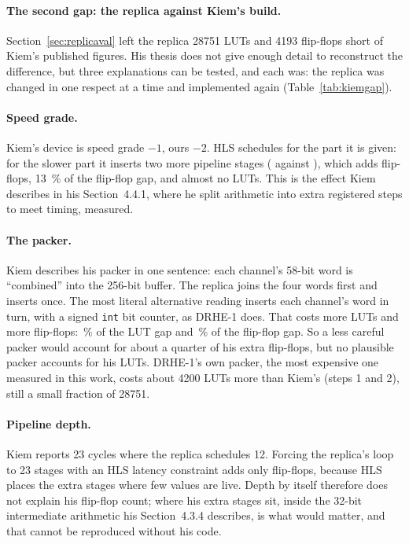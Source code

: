 \paragraph{The second gap: the replica against Kiem's build.}
Section~\ref{sec:replicaval} left the replica \num{28751} LUTs and \num{4193}
flip-flops short of Kiem's published figures. His thesis does not give enough
detail to reconstruct the difference, but three explanations can be tested, and
each was: the replica was changed in one respect at a time and implemented
again (Table~\ref{tab:kiemgap}).



\paragraph{Speed grade.} Kiem's device is speed grade $-1$, ours $-2$. HLS
schedules for the part it is given: for the slower part it inserts two more
pipeline stages ( against ), which adds
 flip-flops, \SI{13}{\percent} of the flip-flop gap, and
almost no LUTs. This is the effect Kiem describes in his Section~4.4.1, where
he split arithmetic into extra registered steps to meet timing, measured.

\paragraph{The packer.} Kiem describes his packer in one sentence: each
channel's 58-bit word is ``combined'' into the 256-bit buffer. The replica
joins the four words first and inserts once. The most literal alternative
reading inserts each channel's word in turn, with a signed \texttt{int} bit
counter, as DRHE-1 does. That costs  more LUTs and
 more flip-flops: \,\% of the
LUT gap and \,\% of the flip-flop gap. So a less
careful packer would account for about a quarter of his extra flip-flops, but
no plausible packer accounts for his LUTs. DRHE-1's own packer, the most
expensive one measured in this work, costs about \num{4200} LUTs more than
Kiem's (steps 1 and 2), still a small fraction of \num{28751}.

\paragraph{Pipeline depth.} Kiem reports 23 cycles where the replica
schedules 12. Forcing the replica's loop to 23 stages with an HLS latency
constraint adds only  flip-flops, because HLS places
the extra stages where few values are live. Depth by itself therefore does not
explain his flip-flop count; where his extra stages sit, inside the 32-bit
intermediate arithmetic his Section~4.3.4 describes, is what would matter, and
that cannot be reproduced without his code.

